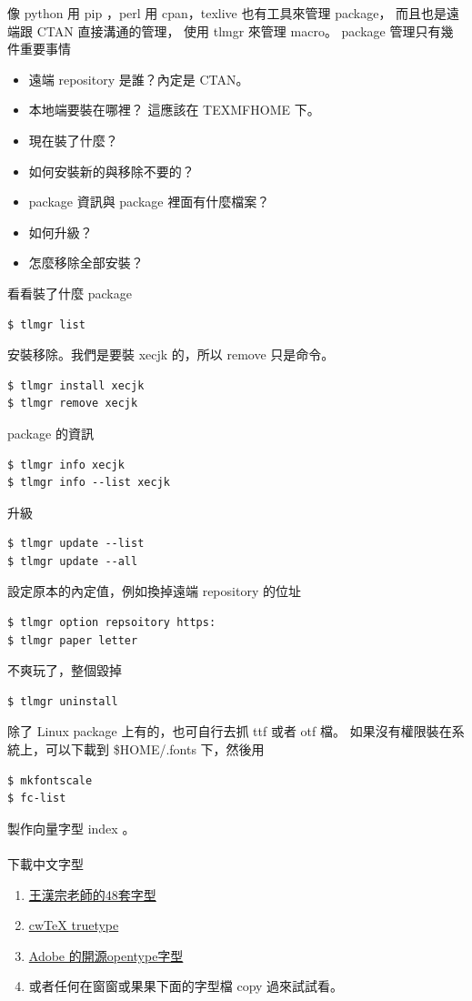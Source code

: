 像 python 用 pip ，perl 用 cpan，texlive 也有工具來管理 package，
而且也是遠端跟 CTAN 直接溝通的管理， 使用 tlmgr 來管理 macro。
package 管理只有幾件重要事情
\begin{itemize}
\item 遠端 repository 是誰？內定是 CTAN。
\item 本地端要裝在哪裡？ 這應該在 TEXMFHOME 下。
\item 現在裝了什麼？
\item 如何安裝新的與移除不要的？
\item package 資訊與 package 裡面有什麼檔案？
\item 如何升級？
\item 怎麼移除全部安裝？
\end{itemize}
看看裝了什麼 package
\begin{verbatim}
$ tlmgr list
\end{verbatim}
安裝移除。我們是要裝 xecjk 的，所以 remove 只是命令。
\begin{verbatim}
$ tlmgr install xecjk
$ tlmgr remove xecjk
\end{verbatim}
package 的資訊
\begin{verbatim}
$ tlmgr info xecjk
$ tlmgr info --list xecjk
\end{verbatim}
升級
\begin{verbatim}
$ tlmgr update --list
$ tlmgr update --all
\end{verbatim}
設定原本的內定值，例如換掉遠端 repository 的位址
\begin{verbatim}
$ tlmgr option repsoitory https:
$ tlmgr paper letter
\end{verbatim}
不爽玩了，整個毀掉
\begin{verbatim}
$ tlmgr uninstall
\end{verbatim}
除了 Linux package 上有的，也可自行去抓 ttf 或者 otf 檔。
如果沒有權限裝在系統上，可以下載到 \$HOME/.fonts 下，然後用
\begin{verbatim}
$ mkfontscale
$ fc-list
\end{verbatim}
製作向量字型 index 。
\\\\
下載中文字型
\begin{enumerate}
\item \href{https://code.google.com/archive/p/wangfonts/}{王漢宗老師的48套字型}
\item \href{https://github.com/l10n-tw/cwtex-q-fonts}{cwTeX truetype}
\item \href{https://github.com/adobe-fonts/source-han-serif/tree/release#downloading-source-han-serif}{Adobe 的開源opentype字型}
\item 或者任何在窗窗或果果下面的字型檔 copy 過來試試看。
\end{enumerate}
